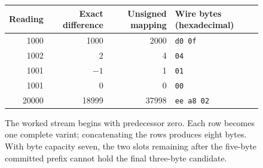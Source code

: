 \begin{figure}[htbp]
  \centering
  \begin{tabular}{r r r l}
    \toprule
    Reading & Exact difference & Unsigned mapping & Wire bytes (hexadecimal) \\
    \midrule
    1000    & 1000             & 2000             & \texttt{d0 0f}           \\
    1002    & 2                & 4                & \texttt{04}              \\
    1001    & $-1$             & 1                & \texttt{01}              \\
    1001    & 0                & 0                & \texttt{00}              \\
    20000   & 18999            & 37998            & \texttt{ee a8 02}        \\
    \bottomrule
  \end{tabular}
  \caption{The worked stream begins with predecessor zero. Each row becomes one complete varint; concatenating the rows produces eight bytes. With byte capacity seven, the two slots remaining after the five-byte committed prefix cannot hold the final three-byte candidate.}
  \label{fig:revision-delta-wire}
\end{figure}
